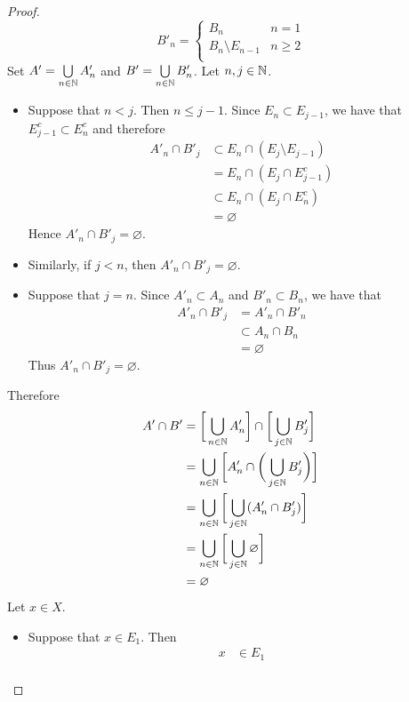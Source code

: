 \documentclass{book}
\begin{document}
\begin{proof}
		\[
		B'_n =
		\begin{cases}
			B_n & n = 1 \\
			B_n \setminus E_{n-1} & n \geq 2 \\
		\end{cases}
		\]
		Set $A' =  \bigcup\limits_{n \in \mathbb{N}} A'_n$ and $B' =  \bigcup\limits_{n \in \mathbb{N}} B'_n$. Let $n, j \in \mathbb{N}$. 
		\begin{itemize}
			\item Suppose that $n < j$. Then $n \leq j-1$. Since $E_n \subset E_{j-1}$, we have that $E_{j-1}^c \subset E_n^c$ and therefore
			\begin{align*}
				A'_n \cap B'_j 
				& \subset E_n \cap (E_j \setminus E_{j-1}) \\
				& = E_n \cap (E_j \cap E_{j-1}^c) \\
				& \subset E_n \cap (E_j\cap E_n^c) \\
				& = \varnothing
			\end{align*}
			Hence $A'_n \cap B'_j = \varnothing$.
			\item Similarly, if $j < n$, then $A'_n \cap B'_j = \varnothing$.
			\item Suppose that $j = n$. Since $A'_n \subset A_n$ and $B'_n \subset B_n$, we have that 
			\begin{align*}
				A'_n \cap B'_j
				& = A'_n \cap B'_n \\
				& \subset A_n \cap B_n \\
				& = \varnothing
			\end{align*}
			Thus $A'_n \cap B'_j = \varnothing$.
		\end{itemize}
		Therefore 
		\begin{align*}
			A' \cap B'
			& = \bigg[ \bigcup_{n \in \mathbb{N}} A'_n \bigg] \cap \bigg[ \bigcup_{j \in \mathbb{N}} B'_j \bigg] \\
			& = \bigcup_{n \in \mathbb{N}} \bigg[ A'_n \cap \bigg( \bigcup_{j \in \mathbb{N}} B'_j \bigg) \bigg] \\
			& = \bigcup_{n \in \mathbb{N}} \bigg[ \bigcup_{j \in \mathbb{N}} (A'_n \cap  B'_j) \bigg] \\
			& = \bigcup_{n \in \mathbb{N}} \bigg[ \bigcup_{j \in \mathbb{N}} \varnothing \bigg] \\
			& = \varnothing
		\end{align*} 
		Let $x \in X$. 
		\begin{itemize}
			\item Suppose that $x \in E_1$. Then 
			\begin{align*}
				x 
				& \in E_1 \\

\end{align*}
\end{itemize}
\end{proof}
\end{document}
